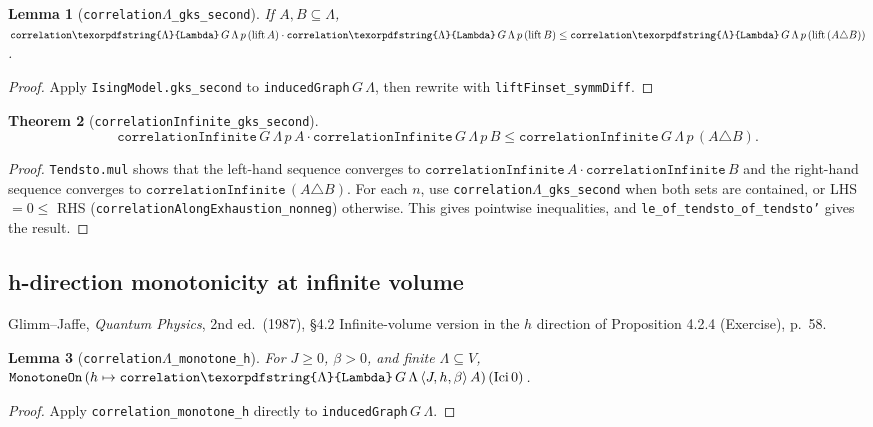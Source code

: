 \documentclass[a4paper,11pt]{article}
\newtheorem{theorem}{Theorem}
\newtheorem{lemma}[theorem]{Lemma}
\newcommand{\LeanLambda}{\texorpdfstring{\ensuremath{\Lambda}}{Lambda}}
\begin{document}
\begin{lemma}[\texttt{correlation\LeanLambda\_gks\_second}]
If $A, B \subseteq \Lambda$,
$\texttt{correlation\LeanLambda}\,G\,\Lambda\,p\,(\text{lift}\,A)
  \cdot \texttt{correlation\LeanLambda}\,G\,\Lambda\,p\,(\text{lift}\,B)
  \le \texttt{correlation\LeanLambda}\,G\,\Lambda\,p\,(\text{lift}\,(A \triangle B))$.
\end{lemma}

\begin{proof}
Apply \texttt{IsingModel.gks\_second} to
\texttt{inducedGraph}\,$G\,\Lambda$, then rewrite with
\texttt{liftFinset\_symmDiff}.
\end{proof}

\begin{theorem}[\texttt{correlationInfinite\_gks\_second}]
\[
\texttt{correlationInfinite}\,G\,\Lambda\,p\,A
  \cdot \texttt{correlationInfinite}\,G\,\Lambda\,p\,B
  \le \texttt{correlationInfinite}\,G\,\Lambda\,p\,(A \triangle B).
\]
\end{theorem}

\begin{proof}
\texttt{Tendsto.mul} shows that the left-hand sequence converges to
$\texttt{correlationInfinite}\,A \cdot \texttt{correlationInfinite}\,B$
and the right-hand sequence converges to
$\texttt{correlationInfinite}\,(A \triangle B)$. For each $n$,
use \texttt{correlation\LeanLambda\_gks\_second} when both sets are contained, or
LHS $= 0 \le$ RHS (\texttt{correlationAlongExhaustion\_nonneg})
otherwise. This gives pointwise inequalities, and
\texttt{le\_of\_tendsto\_of\_tendsto'} gives the result.
\end{proof}

\subsection{h-direction monotonicity at infinite volume}

Glimm--Jaffe, \textit{Quantum Physics}, 2nd ed.\ (1987), \S 4.2
Infinite-volume version in the $h$ direction of Proposition 4.2.4
(Exercise), p.\ 58.

\begin{lemma}[\texttt{correlation\LeanLambda\_monotone\_h}]
For $J \ge 0$, $\beta > 0$, and finite $\Lambda \subseteq V$,
$\texttt{MonotoneOn}\,(h \mapsto \texttt{correlation\LeanLambda}\,G\,\Lambda\,\langle J,h,\beta\rangle\,A)\,(\mathrm{Ici}\,0)$.
\end{lemma}

\begin{proof}
Apply \texttt{correlation\_monotone\_h} directly to
\texttt{inducedGraph}\,$G\,\Lambda$.
\end{proof}
\end{document}
